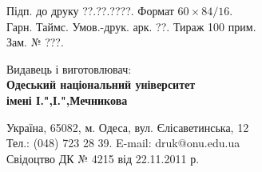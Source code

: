 \documentclass[twoside,a4paper,14pt]{vakaref-utf8}
\begin{document}
\newpage
\pagestyle{empty}
\parindent0pt

\hbox{}
\vfill



\begin{center}


Підп. до друку ??.??.????. Формат $60\times84/16$.\\
Гарн. Таймс. Умов.-друк. арк. ??. Тираж 100 прим.\\
Зам. № ???.

\bigskip
Видавець і виготовлювач:\\
{\bf Одеський національний університет\\ імені І.",І.",Мечникова}
\bigskip

Україна, 65082, м. Одеса, вул. Єлісаветинська, 12\\
Тел.: (048) 723 28 39. E-mail: druk@onu.edu.ua\\
Свідоцтво ДК № 4215 від 22.11.2011 р.

\end{center}
\end{document}
